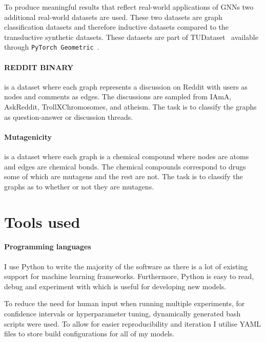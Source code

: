 To produce meaningful results that reflect real-world applications of GNNs two additional real-world datasets are used.
These two datasets are graph classification datasets and therefore inductive datasets compared to the transductive synthetic datasets.
These datasets are part of TUDataset~\cite{Morris+2020} available through \texttt{PyTorch Geometric}~\cite{Fey/Lenssen/2019}.

\paragraph{REDDIT BINARY}
is a dataset where each graph represents a discussion on Reddit with users as nodes and comments as edges.
The discussions are sampled from IAmA, AskReddit, TrollXChromosomes, and atheism.
The task is to classify the graphs as question-answer or discussion threads.

\paragraph{Mutagenicity}
is a dataset where each graph is a chemical compound where nodes are atoms and edges are chemical bonds.
The chemical compounds correspond to drugs some of which are mutagens and the rest are not.
The task is to classify the graphs as to whether or not they are mutagens.

\section{Tools used}


\paragraph{Programming languages}
I use Python to write the majority of the software as there is a lot of existing support for machine learning frameworks.
Furthermore, Python is easy to read, debug and experiment with which is useful for developing new models.

To reduce the need for human input when running multiple experiments, for confidence intervals or hyperparameter tuning, dynamically generated bash scripts were used.
To allow for easier reproducibility and iteration I utilise YAML files to store build configurations for all of my models.

